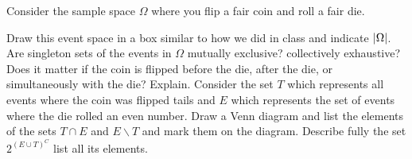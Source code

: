 \documentclass[12pt]{article}
\newcommand{\spc}[1]{\iftoggle{spacingmode}{\\ \vspace{#1cm}}}
\begin{document}

\problem Consider the sample space $\Omega$ where you flip a fair coin and roll a fair die.

\begin{enumerate}
\easysubproblem Draw this event space in a box similar to how we did in class and indicate $\left|\Omega\right|$.
\easysubproblem Are singleton sets of the events in $\Omega$ mutually exclusive? collectively exhaustive?
\easysubproblem Does it matter if the coin is flipped before the die, after the die, or simultaneously with the die? Explain.
\easysubproblem Consider the set $T$ which represents all events where the coin was flipped tails and $E$ which represents the set of events where the die rolled an even number. Draw a Venn diagram and list the elements of the sets $T \cap E$ and $E \backslash T$ and mark them on the diagram.
\intermediatesubproblem Describe fully the set $2^{(E \cup T)^C}$ \ie list all its elements.

\end{enumerate}
\end{document}
